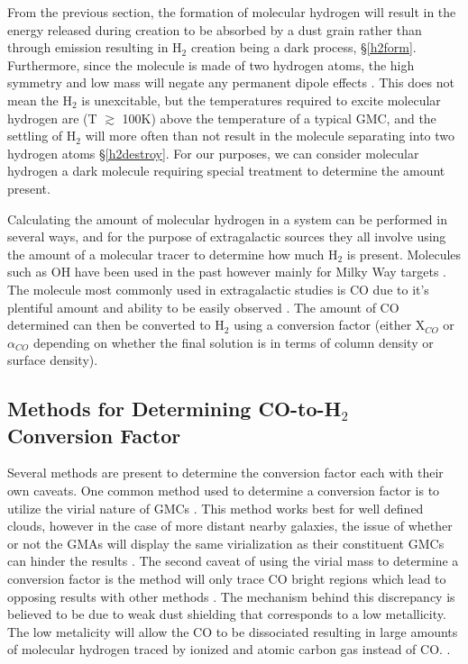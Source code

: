 From the previous section, the formation of molecular hydrogen will result in the energy released during creation to be absorbed by a dust grain rather than through emission resulting in H$_2$ creation being a dark process, \S \ref{h2form}.  Furthermore, since the molecule is made of two hydrogen atoms, the high symmetry and low mass will negate any permanent dipole effects \citep{bolatto2013,kennicutt2012}.  This does not mean the H$_2$ is unexcitable, but the temperatures required to excite molecular hydrogen are (T $\gtrsim$ 100K)  above the temperature of a typical GMC\citep{bolatto2013}, and the settling of H$_2$ will more often than not result in the molecule separating into two hydrogen atoms \S \ref{h2destroy}.  For our purposes, we can consider molecular hydrogen a dark molecule requiring special treatment to determine the amount present.

Calculating the amount of molecular hydrogen in a system can be performed in several ways, and for the purpose of extragalactic sources they all involve using the amount of a molecular tracer to determine how much H$_2$ is present.  Molecules such as OH have been used in the past however mainly for Milky Way targets \citep{barrett1964}.  The molecule most commonly used in extragalactic studies is CO due to it's plentiful amount and ability to be easily observed \citep{bolatto2013}.  The amount of CO determined can then be converted to H$_2$ using a conversion factor (either X$_{CO}$ or $\alpha_{CO}$ depending on whether the final solution is in terms of column density or surface density).


\subsection{Methods for Determining CO-to-H$_2$ Conversion Factor}

Several methods are present to determine the conversion factor each with their own caveats.  One common method used to determine a conversion factor is to utilize the virial nature of GMCs \citep{bolatto2013}.  This method works best for well defined clouds, however in the case of more distant nearby galaxies, the issue of whether or not the GMAs will display the same virialization as their constituent GMCs can hinder the results \citep{bolatto2013}.  The second caveat of using the virial mass to determine a conversion factor is the method will only trace CO bright regions which lead to opposing results with other methods \citep{bolatto2013}.  The mechanism behind this discrepancy is believed to be due to weak dust shielding that corresponds to a low metallicity.  The low metalicity will allow the CO to be dissociated resulting in large amounts of molecular hydrogen traced by ionized and atomic carbon gas instead of CO. \citep{bolatto2013}.  %


